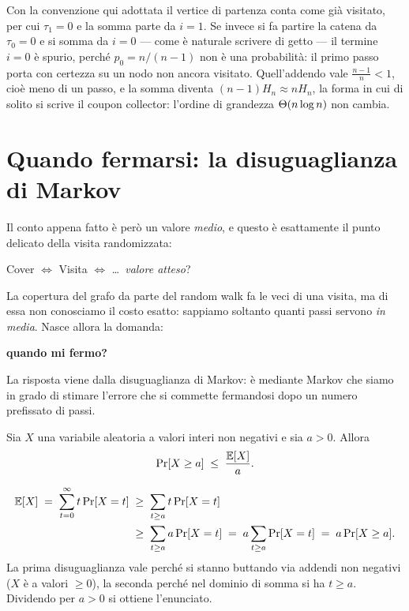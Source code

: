 \begin{osservazione}
Con la convenzione qui adottata il vertice di partenza conta come già visitato, per cui
$\tau_1 = 0$ e la somma parte da $i=1$. Se invece si fa partire la catena da $\tau_0 = 0$ e
si somma da $i=0$ --- come è naturale scrivere di getto --- il termine $i=0$ è spurio, perché
$p_0 = n/(n-1)$ non è una probabilità: il primo passo porta con certezza su un nodo non
ancora visitato. Quell'addendo vale $\frac{n-1}{n} < 1$, cioè meno di un passo, e la somma
diventa $(n-1)H_n \approx n H_n$, la forma in cui di solito si scrive il coupon collector:
l'ordine di grandezza $\Theta(n\log n)$ non cambia.
\end{osservazione}

\section{Quando fermarsi: la disuguaglianza di Markov}

Il conto appena fatto è però un valore \emph{medio}, e questo è esattamente il punto delicato
della visita randomizzata:
\begin{center}
  Cover $\iff$ Visita $\iff$ \dots\ \emph{valore atteso}?
\end{center}
La copertura del grafo da parte del random walk fa le veci di una visita, ma di essa non
conosciamo il costo esatto: sappiamo soltanto quanti passi servono \emph{in media}. Nasce
allora la domanda:
\begin{center}
  \textbf{quando mi fermo?}
\end{center}
La risposta viene dalla disuguaglianza di Markov: è mediante Markov che siamo in grado di
stimare l'errore che si commette fermandosi dopo un numero prefissato di passi.

\begin{teorema}\label{thm:markov}
  Sia $X$ una variabile aleatoria a valori interi non negativi e sia $a > 0$. Allora
  \[
    \operatorname{Pr}[X \ge a] \;\le\; \frac{\mathbb{E}[X]}{a}.
  \]
\end{teorema}

\begin{dimostrazione}
  \begin{align*}
    \mathbb{E}[X] \;=\; \sum_{t=0}^{\infty} t \operatorname{Pr}[X = t]
      &\;\ge\; \sum_{t \ge a} t \operatorname{Pr}[X = t] \\
      &\;\ge\; \sum_{t \ge a} a \operatorname{Pr}[X = t]
      \;=\; a \sum_{t \ge a} \operatorname{Pr}[X = t]
      \;=\; a \operatorname{Pr}[X \ge a].
  \end{align*}
  La prima disuguaglianza vale perché si stanno buttando via addendi non negativi ($X$ è a
  valori $\ge 0$), la seconda perché nel dominio di somma si ha $t \ge a$. Dividendo per
  $a > 0$ si ottiene l'enunciato.
\end{dimostrazione}

